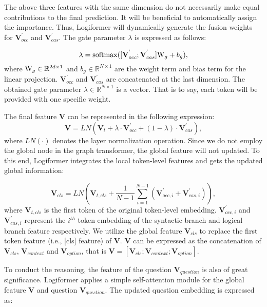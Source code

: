 \documentclass[sigconf]{acmart}
\begin{document}
The above three features with the same dimension do not necessarily make equal contributions to the final prediction. It will be beneficial to automatically assign the importance. Thus, Logiformer will dynamically generate the fusion weights for $\mathbf{V}_{occ}^{'}$ and $\mathbf{V}_{cas}^{'}$. The gate parameter $\lambda$ is expressed as follows:

\begin{equation}
	\lambda = {\rm softmax}([\mathbf{V}_{occ}^{'};\mathbf{V}_{cas}^{'}]{\rm W}_{g}+b_{g}),
\end{equation}
where ${\rm W}_{g} \in \mathbb{R}^{2d \times 1}$ and $b_{g} \in \mathbb{R}^{N\times 1}$ are the weight term and bias term for the linear projection. $\mathbf{V}_{occ}^{'}$ and $\mathbf{V}_{cas}^{'}$ are concatenated at the last dimension. The obtained gate parameter $\lambda \in \mathbb{R}^{N\times 1}$ is a vector. That is to say, each token will be provided with one specific weight.

The final feature $\mathbf{V}$ can be represented in the following expression:
\begin{equation}
	\mathbf{V} = LN(\mathbf{V}_{t} + \lambda \cdot \mathbf{V}_{occ}^{'} + (1-\lambda) \cdot \mathbf{V}_{cas}^{'}),
\end{equation}
where $LN(\cdot)$ denotes the layer normalization operation. Since we do not employ the global node in the graph transformer, the global feature will not updated. To this end, Logiformer integrates the local token-level features and gets the updated global information:

\begin{equation}
	\mathbf{V}_{cls} = LN(\mathbf{V}_{t,cls} + \frac{1}{N-1}\sum\limits_{i=1}^{N-1} {(\mathbf{V}_{occ,i}^{'}+\mathbf{V}_{cas,i}^{'})}),
\end{equation}
where $\mathbf{V}_{t,cls}$ is the first token of the original token-level embedding. $\mathbf{V}_{occ,i}^{'}$ and $\mathbf{V}_{cas,i}^{'}$ represent the $i^{th}$ token embedding of the syntactic branch and logical branch feature respectively. We utilize the global feature $\mathbf{V}_{cls}$ to replace the first token feature (i.e., [cls] feature) of $\mathbf{V}$. $\mathbf{V}$ can be expressed as the concatenation of $\mathbf{V}_{cls}$, $\mathbf{V}_{context}$ and $\mathbf{V}_{option}$, that is $\mathbf{V} = [\mathbf{V}_{cls};\mathbf{V}_{context};\mathbf{V}_{option}]$.

To conduct the reasoning, the feature of the question $\mathbf{V}_{question}$ is also of great significance. Logiformer applies a simple self-attention module for the global feature $\mathbf{V}$ and question $\mathbf{V}_{question}$. The updated question embedding is expressed as:
\end{document}
